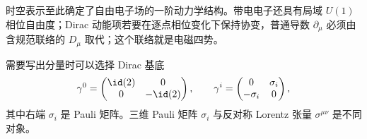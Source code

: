时空表示至此确定了自由电子场的一阶动力学结构。带电电子还具有局域 $U(1)$ 相位自由度；Dirac 动能项若要在逐点相位变化下保持协变，普通导数 $\partial_\mu$ 必须由含规范联络的 $D_\mu$ 取代；这个联络就是电磁四势。

\begin{note}[一个常用显式表示]
需要写出分量时可以选择 Dirac 基底
\begin{equation*}
 \gamma^0=
 \begin{pmatrix}\id(2)&0\\0&-\id(2)\end{pmatrix},
 \qquad
 \gamma^i=
 \begin{pmatrix}0&\sigma_i\\-\sigma_i&0\end{pmatrix},
\end{equation*}
其中右端 $\sigma_i$ 是 Pauli 矩阵。三维 Pauli 矩阵 $\sigma_i$ 与反对称 Lorentz 张量 $\sigma^{\mu\nu}$ 是不同对象。
\end{note}










